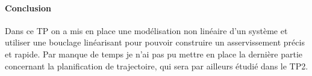 \documentclass[10pt,a4paper,notitlepage]{article}
\begin{document}
\paragraph{Conclusion}

Dans ce TP on a mis en place une modélisation non linéaire d'un
système et utiliser une bouclage linéarisant pour pouvoir construire
un asservissement précis et rapide. Par manque de temps je n'ai pas pu
mettre en place la dernière partie concernant la planification de
trajectoire, qui sera par ailleurs étudié dans le TP2.
\end{document}
